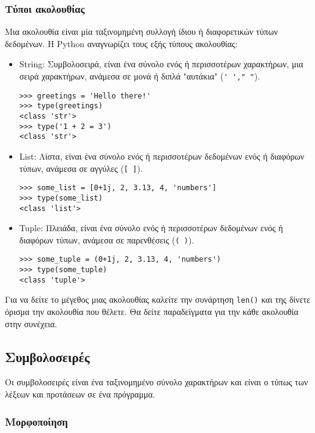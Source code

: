 \documentclass[12pt]{extreport}
\begin{document}
\subsubsection{Τύποι ακολουθίας}

Μια ακολουθία είναι μία ταξινομημένη συλλογή ίδιου ή διαφορετικών τύπων δεδομένων. Η Python αναγνωρίζει τους εξής τύπους ακολουθίας:

\begin{itemize}
    \item String: Συμβολοσειρά, είναι ένα σύνολο ενός ή περισσοτέρων χαρακτήρων, μια σειρά χαρακτήρων, ανάμεσα σε μονά ή διπλά "αυτάκια" (\lstinline[language={}]{' '," "}).
          \begin{lstlisting}[numbers=none]
>>> greetings = 'Hello there!'
>>> type(greetings)
<class 'str'>
>>> type('1 + 2 = 3')
<class 'str'>
\end{lstlisting}
    \item List: Λίστα, είναι ένα σύνολο ενός ή περισσοτέρων δεδομένων ενός ή διαφόρων τύπων, ανάμεσα σε αγγύλες (\lstinline[language={}]{[ ]}).
          \begin{lstlisting}[numbers=none]
>>> some_list = [0+1j, 2, 3.13, 4, 'numbers']
>>> type(some_list)
<class 'list'>    
\end{lstlisting}
    \item Tuple: Πλειάδα, είναι ένα σύνολο ενός ή περισσοτέρων δεδομένων ενός ή διαφόρων τύπων, ανάμεσα σε παρενθέσεις (\lstinline[language={}]{( )}).
          \begin{lstlisting}[numbers=none]
>>> some_tuple = (0+1j, 2, 3.13, 4, 'numbers')
>>> type(some_tuple)
<class 'tuple'>    
\end{lstlisting}
\end{itemize}

Για να δείτε το μέγεθος μιας ακολουθίας καλείτε την συνάρτηση \lstinline{len()} και της δίνετε όρισμα την ακολουθία που θέλετε. Θα δείτε παραδείγματα για την κάθε ακολουθία στην συνέχεια.


\newpage
\subsection{Συμβολοσειρές}

Οι συμβολοσειρές είναι ένα ταξινομημένο σύνολο χαρακτήρων και είναι ο τύπως των λέξεων και προτάσεων σε ένα πρόγραμμα.

\subsubsection{Μορφοποίηση}
\end{document}
